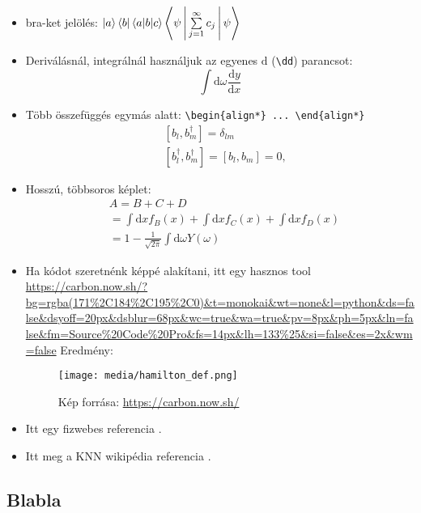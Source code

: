 \documentclass[12pt]{article}
\theoremstyle{plain}
\newcommand{\dd}{\textrm{d}}
\begin{document}
\begin{itemize}
    \item bra-ket jelölés: $\ket a \bra b \braket{a|b|c} \Braket{\psi|\sum\limits_{j=1}^{\infty} c_j | \psi}$
    
    \item Deriválásnál, integrálnál használjuk az egyenes $\dd$ (\texttt{\textbackslash dd}) parancsot: 
    \begin{equation*}
        \int \dd \omega \frac{\dd y}{\dd x}
    \end{equation*}

    \item Több összefüggés egymás alatt: \texttt{\textbackslash begin\{align*\} ... \textbackslash end\{align*\}}
    \begin{align*}
        &[b_l, b^\dagger_m] = \delta_{lm} \\
        &[b^\dagger_l, b^\dagger_m] = [b_l,b_m]=0 \textrm{,}
    \end{align*}

    \item Hosszú, többsoros képlet:
    \begin{align*}
        & A = B + C + D   \\
        & = \int \dd x f_B(x) + \int \dd x f_C(x) + \int \dd x f_D(x) \\
        & = 1-\frac{1}{\sqrt{2\pi}}\int \dd\omega Y(\omega)
    \end{align*}  
    
    \item Ha kódot szeretnénk képpé alakítani, itt egy hasznos tool \url{https://carbon.now.sh/?bg=rgba(171%2C184%2C195%2C0)&t=monokai&wt=none&l=python&ds=false&dsyoff=20px&dsblur=68px&wc=true&wa=true&pv=8px&ph=5px&ln=false&fm=Source%20Code%20Pro&fs=14px&lh=133%25&si=false&es=2x&wm=false}
    Eredmény:
    \begin{figure}[H]
        \begin{center}
        \texttt{[image: media/hamilton\_def.png]}
        \caption{Kép forrása: \url{https://carbon.now.sh/}} 
        \end{center}
    \end{figure}
    \item Itt egy fizwebes referencia \cite{fizweb}.
    \item Itt meg a KNN wikipédia referencia \cite{knnwiki}.
\end{itemize}

\subsection{Blabla}



\end{document}
